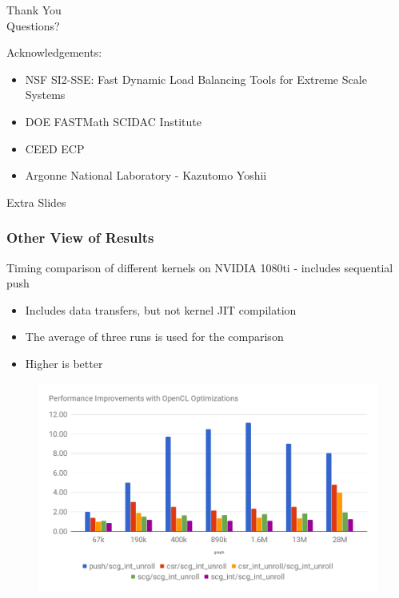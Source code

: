 \documentclass{beamer}
\begin{document}
\begin{frame}
  \begin{center}
    {\huge
      Thank You\\
      \bigskip
      \bigskip
      \bigskip
      \bigskip
      \bigskip
      \huge
      Questions?\\
      \bigskip
      \bigskip
      \bigskip
    }
  \end{center}
  \large
  Acknowledgements:\\
  \begin{itemize}
    \item NSF SI2-SSE: Fast Dynamic Load Balancing Tools for Extreme Scale Systems
    \item DOE FASTMath SCIDAC Institute
    \item CEED ECP
    \item Argonne National Laboratory - Kazutomo Yoshii
  \end{itemize}
\end{frame}

\begin{frame}
  \center \huge Extra Slides
\end{frame}

\begin{frame}
  \frametitle{Other View of Results}
  \tiny
  Timing comparison of different kernels on NVIDIA 1080ti - includes sequential
  push
  \begin{itemize}
    \item Includes data transfers, but not kernel JIT compilation
    \item The average of three runs is used for the comparison
    \item Higher is better
  \end{itemize}
  \begin{figure}
    \centering
    \includegraphics[width=.9\textwidth]{results/bfs.png}
  \end{figure}  
\end{frame}
\end{document}

